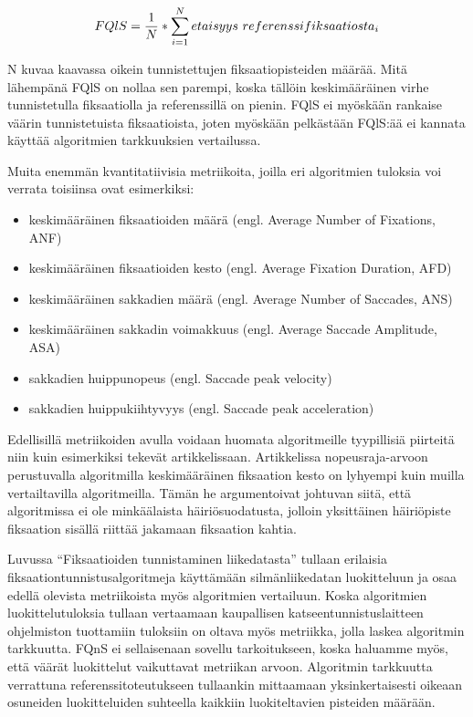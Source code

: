 \[
FQlS = {1 \over N} * \sum\limits_{i=1}^N etaisyys\ referenssifiksaatiosta_i
\]

N kuvaa kaavassa oikein tunnistettujen fiksaatiopisteiden määrää. Mitä lähempänä FQlS on nollaa sen parempi, koska tällöin keskimääräinen virhe tunnistetulla fiksaatiolla ja referenssillä on pienin. FQlS ei myöskään rankaise väärin tunnistetuista fiksaatioista, joten myöskään pelkästään FQlS:ää ei kannata käyttää algoritmien tarkkuuksien vertailussa.

Muita enemmän kvantitatiivisia metriikoita, joilla eri algoritmien tuloksia voi verrata toisiinsa ovat esimerkiksi:
\begin{itemize}
  \item keskimääräinen fiksaatioiden määrä (engl. Average Number of Fixations, ANF)
  \item keskimääräinen fiksaatioiden kesto (engl. Average Fixation Duration, AFD)
  \item keskimääräinen sakkadien määrä (engl. Average Number of Saccades, ANS)
	\item keskimääräinen sakkadin voimakkuus (engl. Average Saccade Amplitude, ASA)
	\item sakkadien huippunopeus (engl. Saccade peak velocity)
	\item sakkadien huippukiihtyvyys (engl. Saccade peak acceleration)
	
\end{itemize} \citep[s. 4]{komogortsev2010} \citep[s. 195]{nystrom2010}

Edellisillä metriikoiden avulla voidaan huomata algoritmeille tyypillisiä piirteitä niin kuin esimerkiksi \citet[s. 195]{nystrom2010} tekevät artikkelissaan. Artikkelissa nopeusraja-arvoon perustuvalla algoritmilla keskimääräinen fiksaation kesto on lyhyempi kuin muilla vertailtavilla algoritmeilla. Tämän he argumentoivat johtuvan siitä, että algoritmissa ei ole minkäälaista häiriösuodatusta, jolloin yksittäinen häiriöpiste fiksaation sisällä riittää jakamaan fiksaation kahtia.

Luvussa ``Fiksaatioiden tunnistaminen liikedatasta'' tullaan erilaisia fiksaationtunnistusalgoritmeja käyttämään silmänliikedatan luokitteluun ja osaa edellä olevista metriikoista myös algoritmien vertailuun. Koska algoritmien luokittelutuloksia tullaan vertaamaan kaupallisen katseentunnistuslaitteen ohjelmiston tuottamiin tuloksiin on oltava myös metriikka, jolla laskea algoritmin tarkkuutta. FQnS ei sellaisenaan sovellu tarkoitukseen, koska haluamme myös, että väärät luokittelut vaikuttavat metriikan arvoon. Algoritmin  tarkkuutta verrattuna referenssitoteutukseen tullaankin mittaamaan yksinkertaisesti oikeaan osuneiden luokitteluiden suhteella kaikkiin luokiteltavien pisteiden määrään.




